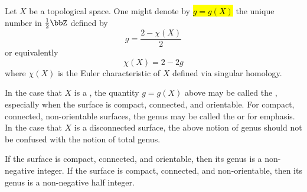 \begin{definition} \label{definition:genus_of_a_topological_space}
Let $X$ be a topological space. 
One might denote by \hl{$g = g(X)$} the unique number in $\frac{1}{2} \bbZ$ defined by
$$g = \frac{2-\chi(X)}{2}$$
or equivalently 
$$\chi(X) = 2 - 2g$$
where $\chi(X)$ is the Euler characteristic of $X$ defined via singular homology.

In the case that $X$ is a , the quantity $g = g(X)$ above may be called the , especially when the surface is compact, connected, and orientable. For compact, connected, non-orientable surfaces, the genus may be called the  or  for emphasis. In the case that $X$ is a disconnected surface, the above notion of genus should not be confused with the notion of total genus. 

If the surface is compact, connected, and orientable, then its genus is a non-negative integer. If the surface is compact, connected, and non-orientable, then its genus is a non-negative half integer.
\end{definition}